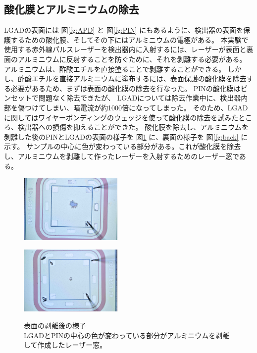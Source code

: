 \subsection{酸化膜とアルミニウムの除去}
LGADの表面には 図\ref{fg:APD} と 図\ref{fg:PIN} にもあるように、検出器の表面を保護するための酸化膜、そしてその下にはアルミニウムの電極がある。
本実験で使用する赤外線パルスレーザーを検出器内に入射するには、レーザーが表面と裏面のアルミニウムに反射することを防ぐために、それを剥離する必要がある。
アルミニウムは、酢酸エチルを直接塗ることで剥離することができる。
しかし、酢酸エチルを直接アルミニウムに塗布するには、表面保護の酸化膜を除去する必要があるため、まずは表面の酸化膜の除去を行なった。
PINの酸化膜はピンセットで問題なく除去できたが、
LGADについては除去作業中に、検出器内部を傷つけてしまい、暗電流が約1000倍になってしまった。
そのため、LGADに関してはワイヤーボンディングのウェッジを使って酸化膜の除去を試みたところ、検出器への損傷を抑えることができた。
酸化膜を除去し、アルミニウムを剥離した後のPINとLGADの表面の様子を 図\ref{fg:front} に、裏面の様子を 図\ref{fg:back} に示す。
サンプルの中心に色が変わっている部分がある。これが酸化膜を除去し、アルミニウムを剥離して作ったレーザーを入射するためのレーザー窓である。

\begin{figure}[h]
    \begin{minipage}[b]{0.5\linewidth}
        \centering
        \includegraphics[width=5cm]{fig/ch4/PIN_front.jpeg}
        \label{fg:PIN_front}
    \end{minipage}
    \begin{minipage}[b]{0.5\linewidth}
        \centering
        \includegraphics[width=5cm]{fig/ch4/APD_front.jpeg}
        \label{fg:APD_front}
    \end{minipage}
    \caption[表面の剥離後の様子]{表面の剥離後の様子\\LGADとPINの中心の色が変わっている部分がアルミニウムを剥離して作成したレーザー窓。}
    \label{fg:front}
\end{figure}


